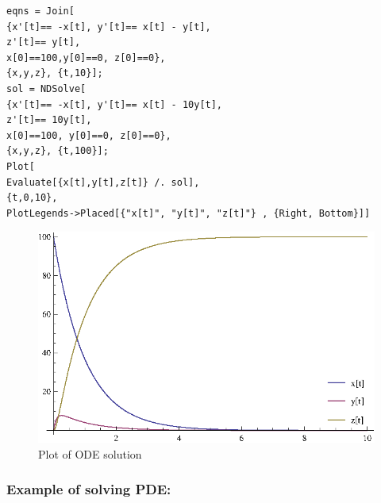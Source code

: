 \begin{lstlisting}[caption=ODE solution,
  label=code:ode,
  float=t]
eqns = Join[
{x'[t]== -x[t], y'[t]== x[t] - y[t], 
z'[t]== y[t],
x[0]==100,y[0]==0, z[0]==0},
{x,y,z}, {t,10}];
sol = NDSolve[
{x'[t]== -x[t], y'[t]== x[t] - 10y[t], 
z'[t]== 10y[t],
x[0]==100, y[0]==0, z[0]==0},
{x,y,z}, {t,100}];
Plot[
Evaluate[{x[t],y[t],z[t]} /. sol], 
{t,0,10}, 
PlotLegends->Placed[{"x[t]", "y[t]", "z[t]"} , {Right, Bottom}]]
\end{lstlisting}

\begin{figure}[h!]
  \centering
    \includegraphics[scale=1]{figures/ODE}
  \caption{Plot of ODE solution}
  \label{fig:ODE}
\end{figure}

\subsubsection{Example of solving PDE:}
